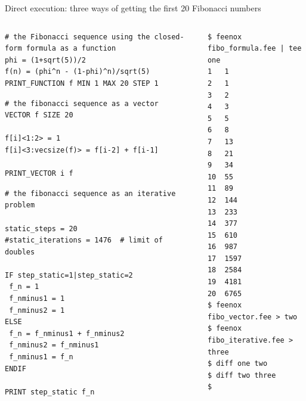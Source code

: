 \documentclass[
  ignorenonframetext,
  aspectratio=169,
]{beamer}
\begin{document}
\begin{frame}[fragile]{Direct execution: three ways of getting the first
20 Fibonacci numbers}
\protect\hypertarget{direct-execution-three-ways-of-getting-the-first-20-fibonacci-numbers}{}
\begin{columns}[T]
\begin{column}{0.6\textwidth}
\begin{lstlisting}[style=feenox]
# the Fibonacci sequence using the closed-form formula as a function
phi = (1+sqrt(5))/2 
f(n) = (phi^n - (1-phi)^n)/sqrt(5)
PRINT_FUNCTION f MIN 1 MAX 20 STEP 1
\end{lstlisting}

\pause

\begin{lstlisting}[style=feenox]
# the fibonacci sequence as a vector
VECTOR f SIZE 20

f[i]<1:2> = 1
f[i]<3:vecsize(f)> = f[i-2] + f[i-1]

PRINT_VECTOR i f
\end{lstlisting}

\pause

\begin{lstlisting}[style=feenox]
# the fibonacci sequence as an iterative problem

static_steps = 20
#static_iterations = 1476  # limit of doubles

IF step_static=1|step_static=2
 f_n = 1
 f_nminus1 = 1
 f_nminus2 = 1
ELSE
 f_n = f_nminus1 + f_nminus2
 f_nminus2 = f_nminus1
 f_nminus1 = f_n
ENDIF

PRINT step_static f_n
\end{lstlisting}
\end{column}

\pause

\begin{column}{0.4\textwidth}
\begin{lstlisting}[style=terminal]
$ feenox fibo_formula.fee | tee one
1   1
2   1
3   2
4   3
5   5
6   8
7   13
8   21
9   34
10  55
11  89
12  144
13  233
14  377
15  610
16  987
17  1597
18  2584
19  4181
20  6765
$ feenox fibo_vector.fee > two
$ feenox fibo_iterative.fee > three
$ diff one two
$ diff two three
$
\end{lstlisting}
\end{column}
\end{columns}
\end{frame}
\end{document}
